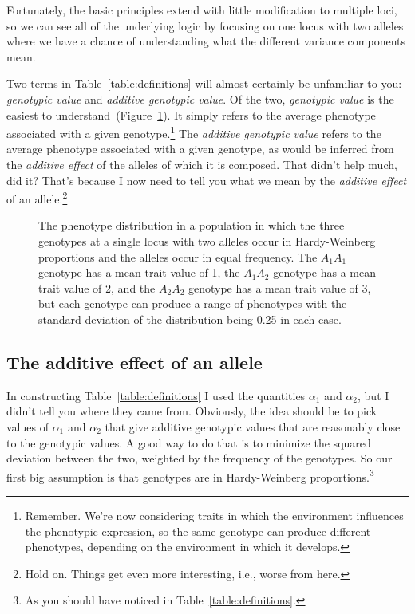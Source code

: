 \documentclass[12pt]{article}
\begin{document}
\noindent Fortunately, the basic principles extend with little
modification to multiple loci, so we can see all of the underlying
logic by focusing on one locus with two alleles where we have a chance
of understanding what the different variance components mean.

Two terms in Table~\ref{table:definitions} will almost certainly be
unfamiliar to you: {\it genotypic value\/} and {\it additive genotypic
  value}. Of the two, {\it genotypic value\/} is the easiest to
understand~(Figure~\ref{fig:genotypic-value}). It simply refers to the
average phenotype associated with a given
genotype.\footnote{Remember. We're now considering traits in which the
  environment influences the phenotypic expression, so the same
  genotype can produce different phenotypes, depending on the
  environment in which it develops.} The {\it additive genotypic
  value\/} refers to the average phenotype associated with a given
genotype, as would be inferred from the {\it additive effect\/} of the
alleles of which it is composed. That didn't help much, did it? That's
because I now need to tell you what we mean by the {\it additive
  effect\/} of an allele.\footnote{Hold on. Things get even more
  interesting, i.e., worse from here.}

\begin{figure}
\begin{center}
\end{center}
\caption{The phenotype distribution in a population in which the three
  genotypes at a single locus with two alleles occur in Hardy-Weinberg
  proportions and the alleles occur in equal frequency. The $A_1A_1$
  genotype has a mean trait value of 1, the $A_1A_2$ genotype has a
  mean trait value of 2, and the $A_2A_2$ genotype has a mean trait
  value of 3, but each genotype can produce a range of phenotypes with
  the standard deviation of the distribution being 0.25 in each
  case.}\label{fig:genotypic-value}
\end{figure}

\subsection*{The additive effect of an allele}

In constructing Table~\ref{table:definitions} I used the quantities
$\alpha_1$ and $\alpha_2$, but I didn't tell you where they came
from. Obviously, the idea should be to pick values of $\alpha_1$ and
$\alpha_2$ that give additive genotypic values that are reasonably
close to the genotypic values. A good way to do that is to minimize
the squared deviation between the two, weighted by the frequency of
the genotypes. So our first big assumption is that genotypes are in
Hardy-Weinberg proportions.\footnote{As you should have noticed in
  Table~\ref{table:definitions}.}
\end{document}
